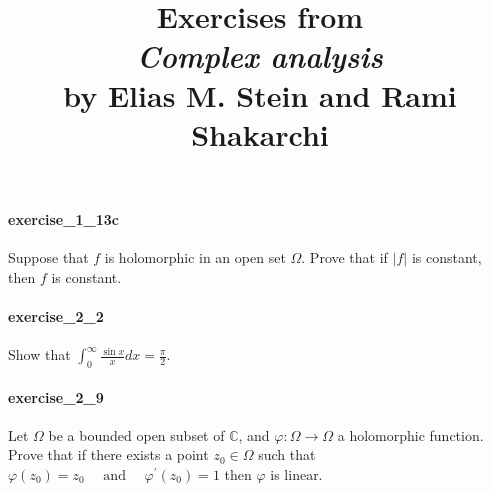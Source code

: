 \documentclass{article}
\title{\textbf{
Exercises from \\
\textit{Complex analysis} \\
by Elias M. Stein and Rami Shakarchi
}}
\date{}
\begin{document}
\maketitle

\paragraph{exercise\_1\_13c} Suppose that $f$ is holomorphic in an open set $\Omega$. Prove that if $|f|$ is constant, then $f$ is constant.

\paragraph{exercise\_2\_2} Show that $\int_{0}^{\infty} \frac{\sin x}{x} d x=\frac{\pi}{2}$.

\paragraph{exercise\_2\_9} Let $\Omega$ be a bounded open subset of $\mathbb{C}$, and $\varphi: \Omega \rightarrow \Omega$ a holomorphic function. Prove that if there exists a point $z_{0} \in \Omega$ such that $\varphi\left(z_{0}\right)=z_{0} \quad \text { and } \quad \varphi^{\prime}\left(z_{0}\right)=1$ then $\varphi$ is linear.
\end{document}
